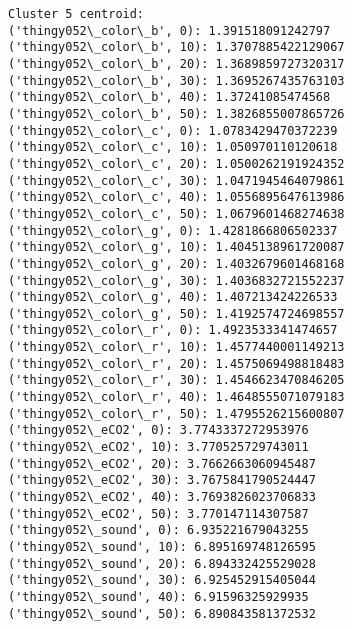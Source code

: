 \documentclass[11pt]{article}
\begin{document}
\begin{Verbatim}[commandchars=\\\{\}]
Cluster 5 centroid:
('thingy052\_color\_b', 0): 1.391518091242797
('thingy052\_color\_b', 10): 1.3707885422129067
('thingy052\_color\_b', 20): 1.3689859727320317
('thingy052\_color\_b', 30): 1.3695267435763103
('thingy052\_color\_b', 40): 1.37241085474568
('thingy052\_color\_b', 50): 1.3826855007865726
('thingy052\_color\_c', 0): 1.0783429470372239
('thingy052\_color\_c', 10): 1.050970110120618
('thingy052\_color\_c', 20): 1.0500262191924352
('thingy052\_color\_c', 30): 1.0471945464079861
('thingy052\_color\_c', 40): 1.0556895647613986
('thingy052\_color\_c', 50): 1.0679601468274638
('thingy052\_color\_g', 0): 1.4281866806502337
('thingy052\_color\_g', 10): 1.4045138961720087
('thingy052\_color\_g', 20): 1.4032679601468168
('thingy052\_color\_g', 30): 1.4036832721552237
('thingy052\_color\_g', 40): 1.407213424226533
('thingy052\_color\_g', 50): 1.4192574724698557
('thingy052\_color\_r', 0): 1.4923533341474657
('thingy052\_color\_r', 10): 1.4577440001149213
('thingy052\_color\_r', 20): 1.4575069498818483
('thingy052\_color\_r', 30): 1.4546623470846205
('thingy052\_color\_r', 40): 1.4648555071079183
('thingy052\_color\_r', 50): 1.4795526215600807
('thingy052\_eCO2', 0): 3.7743337272953976
('thingy052\_eCO2', 10): 3.770525729743011
('thingy052\_eCO2', 20): 3.7662663060945487
('thingy052\_eCO2', 30): 3.7675841790524447
('thingy052\_eCO2', 40): 3.7693826023706833
('thingy052\_eCO2', 50): 3.770147114307587
('thingy052\_sound', 0): 6.935221679043255
('thingy052\_sound', 10): 6.895169748126595
('thingy052\_sound', 20): 6.894332425529028
('thingy052\_sound', 30): 6.925452915405044
('thingy052\_sound', 40): 6.91596325929935
('thingy052\_sound', 50): 6.890843581372532


\end{Verbatim}
\end{document}
